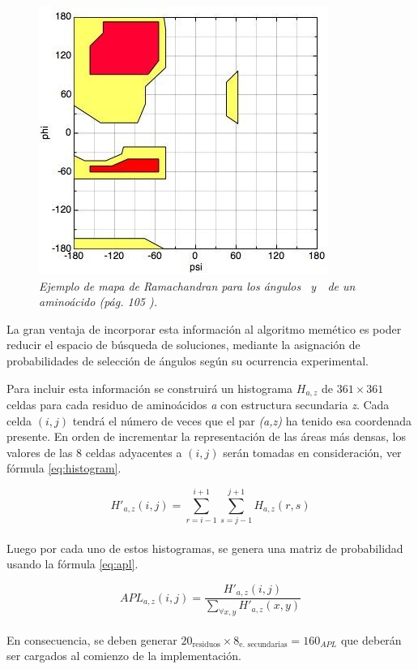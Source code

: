 \begin{figure}[H]
	\centering
	\includegraphics[scale=.5]{images/rama-plot.jpg}
	\caption{\em Ejemplo de mapa de Ramachandran para los ángulos \textphi~y~\textpsi~de un amino\'acido (pág. 105 \citealp{book:kessel}).}
	\label{fig:rmc-glicina} 
\end{figure}

La gran ventaja de incorporar esta información al algoritmo memético es poder reducir el espacio de búsqueda de soluciones, mediante la asignación de probabilidades de selección de ángulos según su ocurrencia experimental.

Para incluir esta información se construirá un histograma \textit{$H_{a,z}$} de $361{\times}361$ celdas para cada residuo de aminoácidos \textit{a} con estructura secundaria \textit{z}. Cada celda $(i,j)$ tendrá el número de veces que el par \textit{(a,z)} ha tenido esa coordenada presente. En orden de incrementar la representación de las áreas más densas, los valores de las 8 celdas adyacentes a $(i,j)$ serán tomadas en consideración, ver fórmula \ref{eq:histogram}. 

\begin{equation}
	\label{eq:histogram}
	H'_{a,z}(i,j)=\sum_{r=i-1}^{i+1}\sum_{s=j-1}^{j+1}H_{a,z}(r,s)
\end{equation}
\\[15pt]
Luego por cada uno de estos histogramas, se genera una matriz de probabilidad usando la fórmula \ref{eq:apl}.

\begin{equation}
	\label{eq:apl}
	APL_{a,z}(i,j)=\frac{H'_{a,z}(i,j)}{\sum_{\forall x,y}H'_{a,z}(x,y)}
\end{equation}
\\[15pt]
En consecuencia, se deben generar $20_{\text{residuos}} {\times} 8_{\text{e. secundarias}} = 160_{APL}$ que deberán ser cargados al comienzo de la implementación.

